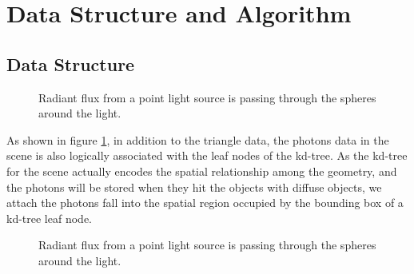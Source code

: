 \section{Data Structure and Algorithm} 

\subsection{Data Structure}

\begin{figure}[htp] 
    \centering 
    \renewcommand{\thefigure}{\thechapter.\arabic{figure}}
    \caption[]{Radiant flux from a point light source is passing through the spheres around the light.}
    \label{fig:kd_leaf_photons} 
\end{figure}  

As shown in figure \ref{fig:kd_leaf_photons}, in addition to the triangle data, the photons data in the scene is also logically associated with the leaf nodes of the kd-tree. As the kd-tree for the scene actually encodes the spatial relationship among the geometry, and the photons will be stored when they hit the objects with diffuse objects, we attach the photons fall into the spatial region occupied by the bounding box of a kd-tree leaf node. 

\begin{figure}[htp] 
    \centering 
    \renewcommand{\thefigure}{\thechapter.\arabic{figure}}
    \caption[]{Radiant flux from a point light source is passing through the spheres around the light.}
    \label{fig:kd_leaf_photons_2} 
\end{figure}  


